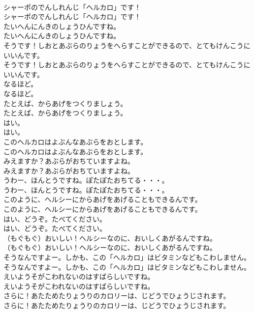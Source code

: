 \documentclass[8pt]{extreport}
\begin{document}
\begin{CJK}{UTF8}{min}
\\	シャーポのでんしれんじ「ヘルカロ」です！
\\	シャーポのでんしれんじ「ヘルカロ」です！
\\	たいへんにんきのしょうひんですね。
\\	たいへんにんきのしょうひんですね。
\\	そうです！しおとあぶらのりょうをへらすことができるので、とてもけんこうにいいんです。
\\	そうです！しおとあぶらのりょうをへらすことができるので、とてもけんこうにいいんです。
\\	なるほど。
\\	なるほど。
\\	たとえば、からあげをつくりましょう。
\\	たとえば、からあげをつくりましょう。
\\	はい。
\\	はい。
\\	このヘルカロはよぶんなあぶらをおとします。
\\	このヘルカロはよぶんなあぶらをおとします。
\\	みえますか？あぶらがおちていますよね。
\\	みえますか？あぶらがおちていますよね。
\\	うわー、ほんとうですね。ぽたぽたおちてる・・・。
\\	うわー、ほんとうですね。ぽたぽたおちてる・・・。
\\	このように、ヘルシーにからあげをあげることもできるんです。
\\	このように、ヘルシーにからあげをあげることもできるんです。
\\	はい、どうぞ。たべてください。
\\	はい、どうぞ。たべてください。
\\	（もぐもぐ）おいしい！ヘルシーなのに、おいしくあがるんですね。
\\	（もぐもぐ）おいしい！ヘルシーなのに、おいしくあがるんですね。
\\	そうなんですよー。しかも、この「ヘルカロ」はビタミンなどもこわしません。
\\	そうなんですよー。しかも、この「ヘルカロ」はビタミンなどもこわしません。
\\	えいようそがこわれないのはすばらしいですね。
\\	えいようそがこわれないのはすばらしいですね。
\\	さらに！あたためたりょうりのカロリーは、じどうでひょうじされます。
\\	さらに！あたためたりょうりのカロリーは、じどうでひょうじされます。

\end{CJK}
\end{document}
